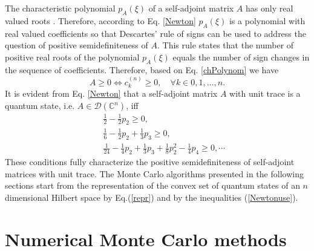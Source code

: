 \documentclass[12pt]{iopart}
\begin{document}
The characteristic polynomial $p_A(\xi)$ of a self-adjoint matrix $A$ has only real valued roots \cite{Rudin}. Therefore, according to Eq. \eqref{Newton} $p_A(\xi)$ is a 
polynomial with real valued coefficients so that
Descartes' rule of signs \cite{D1,D2} can be used to address the question of positive semidefiniteness of $A$. This rule states that the number of positive real roots of the polynomial
$p_A(\xi)$ equals the number of sign
changes in the sequence of coefficients. Therefore, based on Eq. \eqref{chPolynom} we have
\begin{equation}
 A\geqslant0 \Leftrightarrow c^{(n)}_k \geqslant 0, \quad \forall k \in {0,1,\dots,n} . \label{condition}
\end{equation}
It is evident from Eq. \eqref{Newton} that a self-adjoint matrix $A$ with unit trace is a quantum state, i.e. $A \in \mathcal{D}(\mathbb{C}^n)$, iff
\begin{eqnarray}
 &&\frac{1}{2}-\frac{1}{2} p_2\geqslant0, \label{Newtonuse} \\
 &&\frac{1}{6}-\frac{1}{2} p_2+\frac{1}{3}p_3\geqslant0, \nonumber \\
 &&\frac{1}{24}-\frac{1}{4} p_2+\frac{1}{3}p_3+\frac{1}{8} p^2_2-\frac{1}{4} p_4\geqslant0, \cdots\nonumber
\end{eqnarray}
These conditions fully characterize the positive semidefiniteness of self-adjoint matrices with unit trace. 
The Monte Carlo algorithms presented in the following sections start from the representation of the convex set of quantum states
of an $n$ dimensional Hilbert space by Eq.(\ref{repr}) and by the inequalities (\ref{Newtonuse}).


\section{Numerical Monte Carlo methods}
\label{II}
\end{document}
